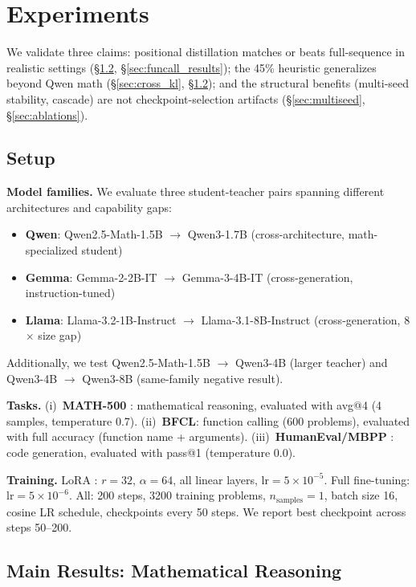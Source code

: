 \documentclass[10pt]{article}
\begin{document}
\section{Experiments}
\label{sec:experiments}

We validate three claims: positional distillation matches or beats full-sequence in realistic settings (\S\ref{sec:math_results}, \S\ref{sec:funcall_results}); the 45\% heuristic generalizes beyond Qwen math (\S\ref{sec:cross_kl}, \S\ref{sec:math_results}); and the structural benefits (multi-seed stability, cascade) are not checkpoint-selection artifacts (\S\ref{sec:multiseed}, \S\ref{sec:ablations}).

\subsection{Setup}
\label{sec:setup}

\textbf{Model families.}
We evaluate three student-teacher pairs spanning different architectures and capability gaps:
\begin{itemize}
  \item \textbf{Qwen}: Qwen2.5-Math-1.5B $\to$ Qwen3-1.7B (cross-architecture, math-specialized student)
  \item \textbf{Gemma}: Gemma-2-2B-IT $\to$ Gemma-3-4B-IT (cross-generation, instruction-tuned)
  \item \textbf{Llama}: Llama-3.2-1B-Instruct $\to$ Llama-3.1-8B-Instruct (cross-generation, 8$\times$ size gap)
\end{itemize}
Additionally, we test Qwen2.5-Math-1.5B $\to$ Qwen3-4B (larger teacher) and Qwen3-4B $\to$ Qwen3-8B (same-family negative result).

\textbf{Tasks.}
(i)~\textbf{MATH-500} \citep{hendrycks2021measuring}: mathematical reasoning, evaluated with avg@4 (4 samples, temperature 0.7).
(ii)~\textbf{BFCL}: function calling (600 problems), evaluated with full accuracy (function name + arguments).
(iii)~\textbf{HumanEval/MBPP} \citep{chen2021evaluating, austin2021program}: code generation, evaluated with pass@1 (temperature 0.0).

\textbf{Training.}
LoRA \citep{hu2022lora}: $r=32$, $\alpha=64$, all linear layers, $\text{lr}=5\times10^{-5}$.
Full fine-tuning: $\text{lr}=5\times10^{-6}$.
All: 200 steps, 3200 training problems, $n_{\text{samples}}=1$, batch size 16, cosine LR schedule, checkpoints every 50 steps.
We report best checkpoint across steps 50--200.

\subsection{Main Results: Mathematical Reasoning}
\label{sec:math_results}
\end{document}
